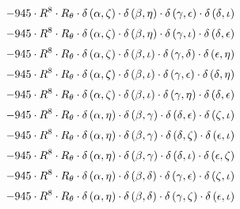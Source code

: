 \begin{subequations}
\begin{gather}
 \\[0.2em] \notag 		 - 945 \cdot R^{8} \cdot R_{\theta{}} \cdot \delta{}\left(\alpha{}, \zeta{}\right) \cdot \delta{}\left(\beta{}, \eta{}\right) \cdot \delta{}\left(\gamma{}, \epsilon{}\right) \cdot \delta{}\left(\delta{}, \iota{}\right) 
 \\[0.2em] \notag 		 - 945 \cdot R^{8} \cdot R_{\theta{}} \cdot \delta{}\left(\alpha{}, \zeta{}\right) \cdot \delta{}\left(\beta{}, \eta{}\right) \cdot \delta{}\left(\gamma{}, \iota{}\right) \cdot \delta{}\left(\delta{}, \epsilon{}\right) 
 \\[0.2em] \notag 		 - 945 \cdot R^{8} \cdot R_{\theta{}} \cdot \delta{}\left(\alpha{}, \zeta{}\right) \cdot \delta{}\left(\beta{}, \iota{}\right) \cdot \delta{}\left(\gamma{}, \delta{}\right) \cdot \delta{}\left(\epsilon{}, \eta{}\right) 
 \\[0.2em] \notag 		 - 945 \cdot R^{8} \cdot R_{\theta{}} \cdot \delta{}\left(\alpha{}, \zeta{}\right) \cdot \delta{}\left(\beta{}, \iota{}\right) \cdot \delta{}\left(\gamma{}, \epsilon{}\right) \cdot \delta{}\left(\delta{}, \eta{}\right) 
 \\[0.2em] \notag 		 - 945 \cdot R^{8} \cdot R_{\theta{}} \cdot \delta{}\left(\alpha{}, \zeta{}\right) \cdot \delta{}\left(\beta{}, \iota{}\right) \cdot \delta{}\left(\gamma{}, \eta{}\right) \cdot \delta{}\left(\delta{}, \epsilon{}\right) 
 \\[0.2em] \notag 		 - 945 \cdot R^{8} \cdot R_{\theta{}} \cdot \delta{}\left(\alpha{}, \eta{}\right) \cdot \delta{}\left(\beta{}, \gamma{}\right) \cdot \delta{}\left(\delta{}, \epsilon{}\right) \cdot \delta{}\left(\zeta{}, \iota{}\right) 
 \\[0.2em] \notag 		 - 945 \cdot R^{8} \cdot R_{\theta{}} \cdot \delta{}\left(\alpha{}, \eta{}\right) \cdot \delta{}\left(\beta{}, \gamma{}\right) \cdot \delta{}\left(\delta{}, \zeta{}\right) \cdot \delta{}\left(\epsilon{}, \iota{}\right) 
 \\[0.2em] \notag 		 - 945 \cdot R^{8} \cdot R_{\theta{}} \cdot \delta{}\left(\alpha{}, \eta{}\right) \cdot \delta{}\left(\beta{}, \gamma{}\right) \cdot \delta{}\left(\delta{}, \iota{}\right) \cdot \delta{}\left(\epsilon{}, \zeta{}\right) 
 \\[0.2em] \notag 		 - 945 \cdot R^{8} \cdot R_{\theta{}} \cdot \delta{}\left(\alpha{}, \eta{}\right) \cdot \delta{}\left(\beta{}, \delta{}\right) \cdot \delta{}\left(\gamma{}, \epsilon{}\right) \cdot \delta{}\left(\zeta{}, \iota{}\right) 
 \\[0.2em] \notag 		 - 945 \cdot R^{8} \cdot R_{\theta{}} \cdot \delta{}\left(\alpha{}, \eta{}\right) \cdot \delta{}\left(\beta{}, \delta{}\right) \cdot \delta{}\left(\gamma{}, \zeta{}\right) \cdot \delta{}\left(\epsilon{}, \iota{}\right) 

\end{gather}
\end{subequations}

